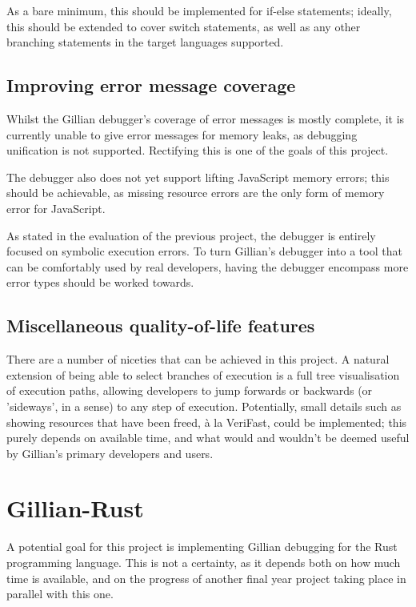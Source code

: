 As a bare minimum, this should be implemented for if-else statements; ideally,
this should be extended to cover switch statements, as well as any other
branching statements in the target languages supported.



\subsection{Improving error message coverage}

Whilst the Gillian debugger's coverage of error messages is mostly complete, it
is currently unable to give error messages for memory leaks, as debugging
unification is not supported. Rectifying this is one of the goals of this
project.

The debugger also does not yet support lifting JavaScript memory errors; this
should be achievable, as missing resource errors are the only form of memory
error for JavaScript.

As stated in the evaluation of the previous project, the debugger is entirely
focused on symbolic execution errors. To turn Gillian's debugger into a tool
that can be comfortably used by real developers, having the debugger encompass
more error types should be worked towards.


\subsection{Miscellaneous quality-of-life features}

There are a number of niceties that can be achieved in this project. A natural
extension of being able to select branches of execution is a full tree
visualisation of execution paths, allowing developers to jump forwards or
backwards (or 'sideways', in a sense) to any step of execution. Potentially,
small details such as showing resources that have been freed, à la VeriFast,
could be implemented; this purely depends on available time, and what would and
wouldn't be deemed useful by Gillian's primary developers and users.


\section{Gillian-Rust}

A potential goal for this project is implementing Gillian debugging for the
Rust programming language. This is not a certainty, as it depends both on how
much time is available, and on the progress of another final year project
taking place in parallel with this one.
